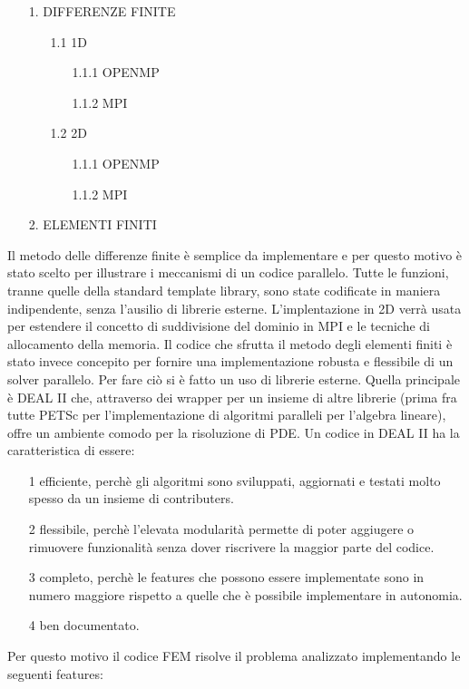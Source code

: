 \documentclass[italian]{article}
\begin{document}
\begin{enumerate}
\item[1.] DIFFERENZE FINITE
\begin{enumerate}
\item[1.1] 1D
\begin{enumerate}
\item[1.1.1] OPENMP
\item[1.1.2] MPI
\end{enumerate}
\item[1.2] 2D
\begin{enumerate}
\item[1.1.1] OPENMP
\item[1.1.2] MPI
\end{enumerate}
\end{enumerate}
\item [2.] ELEMENTI FINITI
\end{enumerate}
Il metodo delle differenze finite è semplice da implementare e per questo motivo è stato scelto per illustrare i meccanismi di un codice parallelo. Tutte le funzioni, tranne quelle della standard template library, sono state codificate in maniera indipendente, senza l'ausilio di librerie esterne. L'implentazione in 2D verrà usata per estendere il concetto di suddivisione del dominio in MPI e le tecniche di allocamento della memoria. Il codice che sfrutta il metodo degli elementi finiti è stato invece concepito per fornire una implementazione robusta e flessibile di un solver parallelo. Per fare ciò si è fatto un uso di librerie esterne. Quella principale è DEAL II che, attraverso dei wrapper per un insieme di altre librerie (prima fra tutte PETSc per l'implementazione di algoritmi paralleli per l'algebra lineare), offre un ambiente comodo per la risoluzione di PDE. Un codice in DEAL II ha la caratteristica di essere:
\begin{enumerate}
\item[1] efficiente, perchè gli algoritmi sono sviluppati, aggiornati e testati molto spesso da un insieme di contributers.
\item[2] flessibile, perchè l'elevata modularità permette di poter aggiugere o rimuovere funzionalità senza dover riscrivere la maggior parte del codice.
\item[3] completo, perchè le features che possono essere implementate sono in numero maggiore rispetto a quelle che è possibile implementare in autonomia.
\item[4] ben documentato.
\end{enumerate}
Per questo motivo il codice FEM risolve il problema analizzato implementando le seguenti features:
\end{document}
